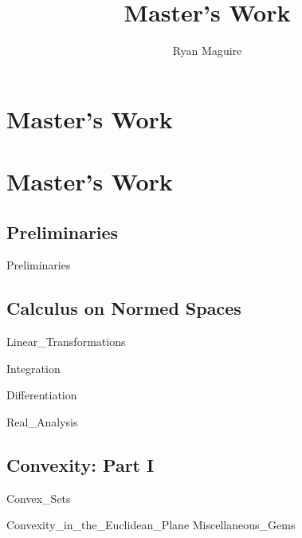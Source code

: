 \documentclass[crop=false,class=book,oneside]{standalone}
\begin{document}
    \newif\ifworkmasterswork
    \ifx\ifresearch\undefined
        \title{Master's Work}
        \author{Ryan Maguire}
        \date{\vspace{-5ex}}
        \maketitle
        \tableofcontents
        \clearpage
        \chapter*{Master's Work}
        \setcounter{chapter}{1}
        \graphicspath{{../../images/}}
    \else
        \chapter{Master's Work}
    \fi
    \section{Preliminaries}
        {Preliminaries}




    \section{Calculus on Normed Spaces}
        
                  {Linear_Transformations}
        
                  {Integration}
        
                  {Differentiation}
        
                  {Real_Analysis}
    \section{Convexity: Part I}
        {Convex_Sets}
        
                  {Convexity_in_the_Euclidean_Plane}
        {Miscellaneous_Gems}
\end{document}
